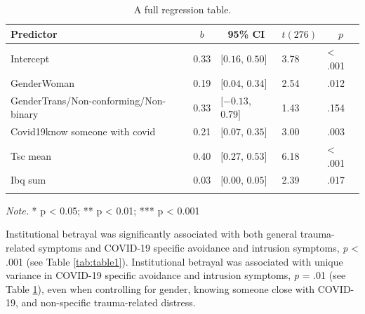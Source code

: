 \documentclass[
  english,
  man, noextraspace]{apa6}
\begin{document}
\begin{table}[tbp]

\begin{center}
\begin{threeparttable}

\caption{\label{tab:table2}A full regression table.}

\begin{tabular}{lllll}
\toprule
Predictor & \multicolumn{1}{c}{$b$} & \multicolumn{1}{c}{95\% CI} & \multicolumn{1}{c}{$t(276)$} & \multicolumn{1}{c}{$p$}\\
\midrule
Intercept & 0.33 & $[0.16$, $0.50]$ & 3.78 & < .001\\
GenderWoman & 0.19 & $[0.04$, $0.34]$ & 2.54 & .012\\
GenderTrans/Non-conforming/Non-binary & 0.33 & $[-0.13$, $0.79]$ & 1.43 & .154\\
Covid19know someone with covid & 0.21 & $[0.07$, $0.35]$ & 3.00 & .003\\
Tsc mean & 0.40 & $[0.27$, $0.53]$ & 6.18 & < .001\\
Ibq sum & 0.03 & $[0.00$, $0.05]$ & 2.39 & .017\\
\bottomrule
\addlinespace
\end{tabular}

\begin{tablenotes}[para]
\normalsize{\textit{Note.} * p < 0.05; ** p < 0.01; *** p < 0.001}
\end{tablenotes}

\end{threeparttable}
\end{center}

\end{table}

Institutional betrayal was significantly associated with both general trauma-related symptoms and COVID-19 specific avoidance and intrusion symptoms, \emph{p} \textless{} .001 (see Table \ref{tab:table1}). Institutional betrayal was associated with unique variance in COVID-19 specific avoidance and intrusion symptoms, \emph{p} = .01 (see Table \ref{tab:table2}), even when controlling for gender, knowing someone close with COVID-19, and non-specific trauma-related distress.
\end{document}
